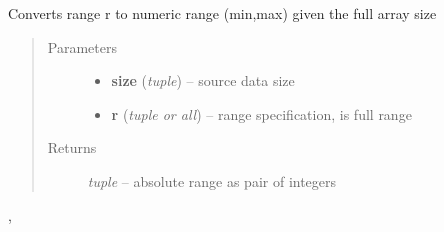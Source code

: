 \documentclass[letterpaper,10pt,english]{sphinxmanual}
\begin{document}

\begin{fulllineitems}
\label{api/ClearMap.IO:ClearMap.IO.IO.toDataRange}
Converts range r to numeric range (min,max) given the full array size
\begin{quote}\begin{description}
\item[{Parameters}] \leavevmode\begin{itemize}
\item {} 
\textbf{size} (\emph{tuple}) --
source data size

\item {} 
\textbf{r} (\emph{tuple or all}) --
range specification,  is full range

\end{itemize}

\item[{Returns}] \leavevmode
\emph{tuple} --
absolute range as pair of integers

\end{description}\end{quote}




{\hyperref[api/ClearMap.IO:ClearMap.IO.IO.toDataSize]{\emph{}}}, {\hyperref[api/ClearMap.IO:ClearMap.IO.IO.dataSizeFromDataRange]{\emph{}}}



\end{fulllineitems}

\end{document}
